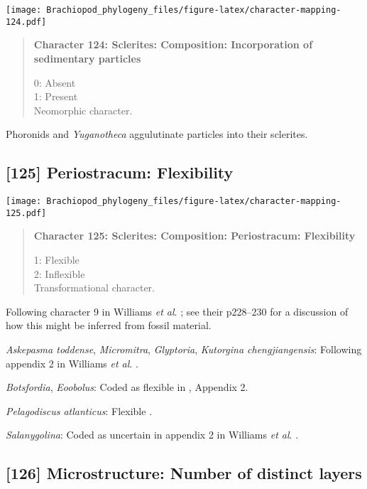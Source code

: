 \documentclass[openany]{book}
\theoremstyle{definition}
\theoremstyle{definition}
\theoremstyle{definition}
\theoremstyle{remark}
\begin{document}
\texttt{[image: Brachiopod\_phylogeny\_files/figure-latex/character-mapping-124.pdf]}

\begin{quote}
\textbf{Character 124: Sclerites: Composition: Incorporation of
sedimentary particles}

0: Absent\\
1: Present\\
Neomorphic character.
\end{quote}

Phoronids and \emph{Yuganotheca} aggulutinate particles into their
sclerites.

\subsection*{{[}125{]} Periostracum:
Flexibility}\label{periostracum-flexibility}

\texttt{[image: Brachiopod\_phylogeny\_files/figure-latex/character-mapping-125.pdf]}

\begin{quote}
\textbf{Character 125: Sclerites: Composition: Periostracum:
Flexibility}

1: Flexible\\
2: Inflexible\\
Transformational character.
\end{quote}

Following character 9 in Williams \emph{et al}.
\citeyearpar{Williams1998Thediversity}; see their p228--230 for a
discussion of how this might be inferred from fossil material.

\hypertarget{Askepasma_toddense-coding-125}{}
\emph{Askepasma toddense}, \emph{Micromitra}, \emph{Glyptoria},
\emph{Kutorgina chengjiangensis}: Following appendix 2 in Williams
\emph{et al}. \citeyearpar{Williams1998Thediversity}.

\hypertarget{Botsfordia-coding-125}{}
\emph{Botsfordia}, \emph{Eoobolus}: Coded as flexible in
\citet{Williams1998Thediversity}, Appendix 2.

\hypertarget{Pelagodiscus_atlanticus-coding-125}{}
\emph{Pelagodiscus atlanticus}: Flexible
\citep{Williams1998Thediversity}.

\hypertarget{Salanygolina-coding-125}{}
\emph{Salanygolina}: Coded as uncertain in appendix 2 in Williams
\emph{et al}. \citeyearpar{Williams1998Thediversity}.

\subsection*{{[}126{]} Microstructure: Number of distinct
layers}\label{microstructure-number-of-distinct-layers}
\end{document}
